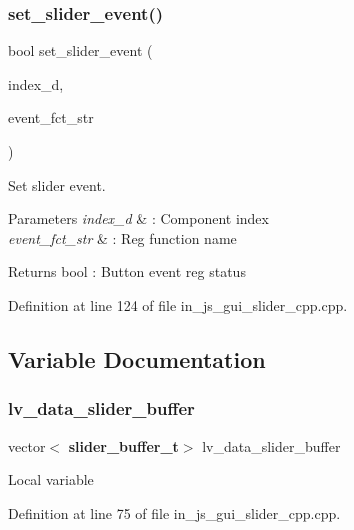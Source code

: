 \subsubsection{set\_slider\_event()}
{\footnotesize\ttfamily bool set\+\_\+slider\+\_\+event (\begin{DoxyParamCaption}\item[{double}]{index\+\_\+d,  }\item[{wx\+String}]{event\+\_\+fct\+\_\+str }\end{DoxyParamCaption})}



Set slider event. 


\begin{DoxyParams}{Parameters}
{\em index\+\_\+d} & \+: Component index \\
\hline
{\em event\+\_\+fct\+\_\+str} & \+: Reg function name \\
\hline
\end{DoxyParams}
\begin{DoxyReturn}{Returns}
bool \+: Button event reg status 
\end{DoxyReturn}


Definition at line 124 of file in\+\_\+js\+\_\+gui\+\_\+slider\+\_\+cpp.\+cpp.



\subsection{Variable Documentation}
\mbox{\label{group___slider_ga64813f8fbd229c0f5955687ef17c349e}} 
\subsubsection{lv\_data\_slider\_buffer}
{\footnotesize\ttfamily vector$<$\textbf{ slider\+\_\+buffer\+\_\+t}$>$ lv\+\_\+data\+\_\+slider\+\_\+buffer}

Local variable 

Definition at line 75 of file in\+\_\+js\+\_\+gui\+\_\+slider\+\_\+cpp.\+cpp.

